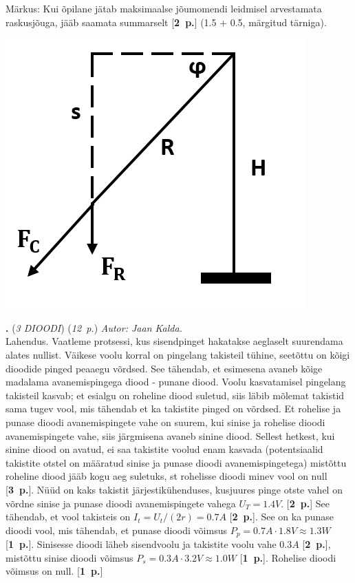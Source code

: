 \documentclass[12pt,a5paper]{article}
\newcommand{\numb}[1]{\vspace{5pt}\textbf{\large #1}}
\newcommand{\nimi}[1]{(\textsl{\small #1})}
\newcommand{\punktid}[1]{(\emph{#1~p.})}
\newcounter{ylesanne}
\newcommand{\yl}[1]{\addtocounter{ylesanne}{1}\numb{\theylesanne.} \nimi{#1} \newblock{}}
\newcommand{\pp}[1]{[\textbf{#1~p.}]}
\newcommand{\autor}[1]{\emph{ Autor: #1.\\}}
\begin{document}
Märkus: Kui õpilane jätab maksimaalse jõumomendi leidmisel arvestamata raskusjõuga, jääb saamata summarselt \pp{2} (1.5 + 0.5, märgitud tärniga).
\begin{center}
\includegraphics[scale=0.5]{Kiik.png}
\end{center}


\yl{3 DIOODI} \punktid{12} \autor{Jaan Kalda}
Lahendus. Vaatleme protsessi, kus sisendpinget hakatakse aeglaselt suurendama alates nullist. Väikese voolu korral on pingelang takisteil tühine, seetõttu on kõigi dioodide pinged peaaegu võrdsed. See tähendab, et esimesena avaneb kõige madalama avanemispingega diood - punane diood. Voolu kasvatamisel pingelang takisteil kasvab; et esialgu on roheline diood suletud, siis läbib mõlemat takistid sama tugev vool, mis tähendab et ka takistite pinged on võrdsed. Et rohelise ja punase dioodi avanemispingete vahe on suurem, kui sinise ja rohelise dioodi avanemispingete vahe, siis järgmisena avaneb sinine diood. Sellest hetkest, kui sinine diood on avatud, ei saa takistite voolud enam kasvada (potentsiaalid takistite otstel on määratud sinise ja punase dioodi avanemispingetega) mistõttu roheline diood jääb kogu aeg suletuks, st rohelisse dioodi minev vool on null \pp{3}. Nüüd on kaks takistit järjestikühenduses, kusjuures pinge otste vahel on võrdne sinise ja punase dioodi avanemispingete vahega $U_T=\SI{1.4}V$. \pp{2} See tähendab, et vool takisteis on $I_t=U_t/(2r)=\SI{0.7}A$ \pp{2}. See on ka punase dioodi vool, mis tähendab, et punase dioodi võimsus $P_p=\SI{0.7}A\cdot \SI{1.8}V\approx {1.3}W$ \pp{1}. Sinisesse dioodi läheb sisendvoolu ja takistite voolu vahe $\SI{0.3}A$ \pp{2}, mistõttu sinise dioodi võimsus $P_s=\SI{0.3}A\cdot \SI{3.2}V\approx {1.0}W$ \pp{1}. Rohelise dioodi võimsus on null. \pp{1}
\end{document}
